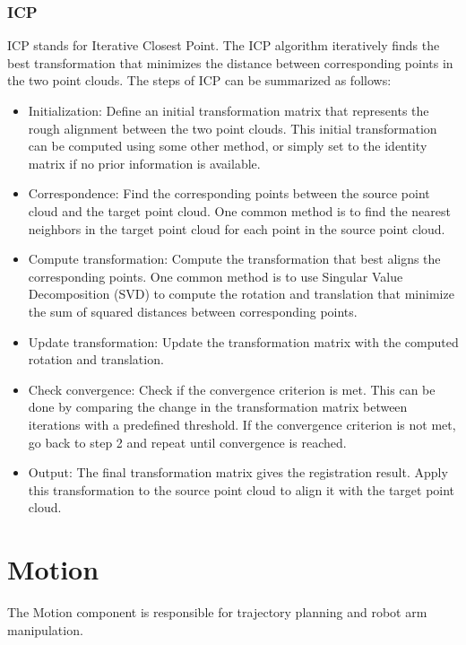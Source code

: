 \documentclass{article}
\begin{document}
	\subsubsection{ICP}
	
	ICP stands for Iterative Closest Point. The ICP algorithm iteratively finds the best transformation that minimizes the distance between corresponding points in the two point clouds. The steps of ICP can be summarized as follows:
	\begin{itemize}
		\item Initialization: Define an initial transformation matrix that represents the rough alignment between the two point clouds. This initial transformation can be computed using some other method, or simply set to the identity matrix if no prior information is available.
		\item Correspondence: Find the corresponding points between the source point cloud and the target point cloud. One common method is to find the nearest neighbors in the target point cloud for each point in the source point cloud.
		\item Compute transformation: Compute the transformation that best aligns the corresponding points. One common method is to use Singular Value Decomposition (SVD) to compute the rotation and translation that minimize the sum of squared distances between corresponding points.
		\item Update transformation: Update the transformation matrix with the computed rotation and translation.
		\item Check convergence: Check if the convergence criterion is met. This can be done by comparing the change in the transformation matrix between iterations with a predefined threshold. If the convergence criterion is not met, go back to step 2 and repeat until convergence is reached.
		\item Output: The final transformation matrix gives the registration result. Apply this transformation to the source point cloud to align it with the target point cloud.
	\end{itemize}
	
	\section{Motion}
	The Motion component is responsible for trajectory planning and robot arm manipulation.
	
\end{document}
